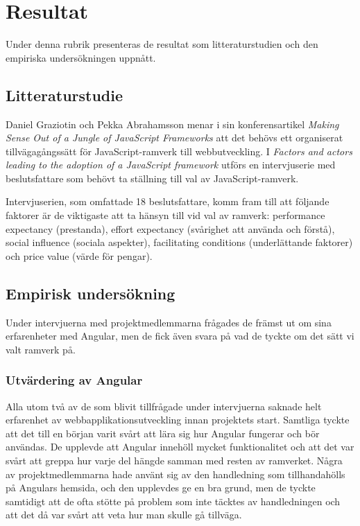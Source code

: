 \section{Resultat}

Under denna rubrik presenteras de resultat som litteraturstudien och den empiriska undersökningen uppnått.

\subsection{Litteraturstudie}

Daniel Graziotin och Pekka Abrahamsson menar i sin konferensartikel \textit{Making Sense Out of a Jungle of JavaScript Frameworks} \cite{making_sense} att det behövs ett organiserat tillvägagångssätt för JavaScript-ramverk till webbutveckling. I \textit{Factors and actors leading to the adoption of a JavaScript framework} \cite{js_framework} utförs en intervjuserie med beslutsfattare som behövt ta ställning till val av JavaScript-ramverk.

Intervjuserien, som omfattade 18 beslutsfattare, komm fram till att följande faktorer är de viktigaste att ta hänsyn till vid val av ramverk: performance expectancy (prestanda), effort expectancy (svårighet att använda och förstå), social influence (sociala aspekter), facilitating conditions (underlättande faktorer) och price value (värde för pengar).



\subsection{Empirisk undersökning}

Under intervjuerna med projektmedlemmarna frågades de främst ut om sina erfarenheter med Angular, men de fick även svara på vad de tyckte om det sätt vi valt ramverk på. 

\subsubsection{Utvärdering av Angular}

Alla utom två av de som blivit tillfrågade under intervjuerna saknade helt erfarenhet av webbapplikationsutveckling innan projektets start. Samtliga tyckte att det till en början varit svårt att lära sig hur Angular fungerar och bör användas. De upplevde att Angular innehöll mycket funktionalitet och att det var svårt att greppa hur varje del hängde samman med resten av ramverket. Några av projektmedlemmarna hade använt sig av den handledning som tillhandahölls på Angulars hemsida, och den upplevdes ge en bra grund, men de tyckte samtidigt att de ofta stötte på problem som inte täcktes av handledningen och att det då var svårt att veta hur man skulle gå tillväga.

